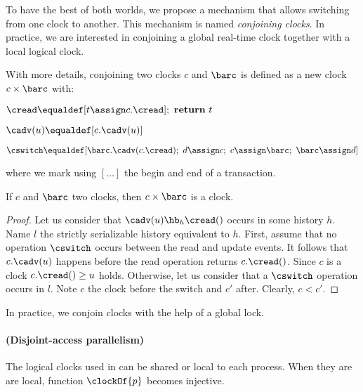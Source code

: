 To have the best of both worlds, we propose a mechanism that allows switching from one clock to another.
This mechanism is named \emph{conjoining clocks}.
In practice, we are interested in conjoining a global real-time clock together with a local logical clock.

With more details, conjoining two clocks $c$ and $\barc$ is defined as a new clock $c \times \barc$ with:
\begin{compactitem}
\item $\cread \equaldef [t \assign c.\cread];~\text{\textbf{return}}~t$
\item $\cadv(u) \equaldef [c.\cadv(u)]$
\item $\cswitch \equaldef [\barc.\cadv(c.\cread);~d \assign c;~c \assign \barc;~\barc \assign d]$
\end{compactitem}
where we mark using $[ \ldots ]$ the begin and end of a transaction.

\begin{proposition}
  If $c$ and $\barc$ two clocks, then $c \times \barc$ is a clock.
\end{proposition}

\begin{proof}  
  Let us consider that $\cadv(u) \hb_h \cread()$ occurs in some history $h$.
  Name $l$ the strictly serializable history equivalent to $h$.
  First, assume that no operation $\cswitch$ occurs between the read and update events.
  It follows that $c.\cadv(u)$ happens before the read operation returns $c.\cread()$.
  Since $c$ is a clock $c.\cread() \geq u$ holds.
  Otherwise, let us consider that a $\cswitch$ operation occurs in $l$.
  Note $c$ the clock before the switch and $c'$ after.
  Clearly, $c < c'$.
  
\end{proof}

In practice, we conjoin clocks with the help of a global lock.

\paragraph{(Disjoint-access parallelism)}
The logical clocks used in  can be shared or local to each process.
When they are are local, function $\clockOf{p}$ becomes injective.



